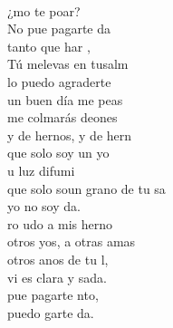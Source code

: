\documentclass[12pt]{article}
\begin{document}
\begin{multicols*}{2}
\begin{cancion}%
	    \\
	¿mo te poar?  \\
	No pue pagarte da   \\
	 tanto que har , \\
	Tú melevas en tusalm  \\
	lo puedo agraderte\\
	un buen día me peas\\
	me colmarás deones\\
	y de hernos, y de hern  \\
	 que solo soy un yo  \\
	u luz difumi\\
	 que solo soun grano de tu sa \\
	yo no soy da.\\
	ro udo a mis herno\\
	otros yos, a otras amas\\
	otros anos de tu l,\\
	 vi es clara y sada. \\
	 pue pagarte nto,\\
	 puedo garte da.\\
\end{cancion}%


\end{multicols*}
\end{document}
